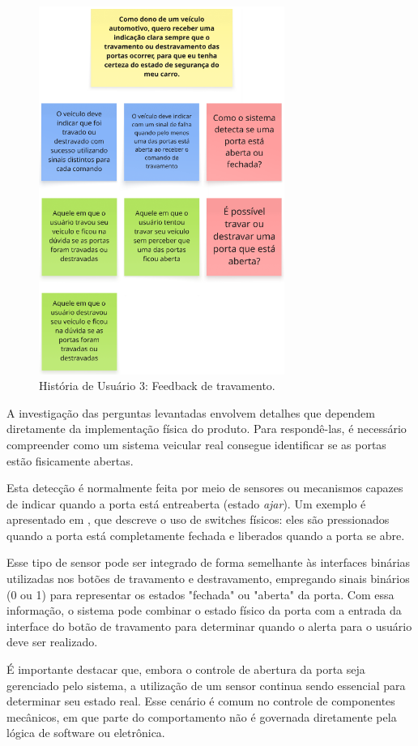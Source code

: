 \begin{figure}[H]
\centering
\includegraphics[height=12cm]{figuras/user_story_3.png}
\caption{História de Usuário 3: Feedback de travamento.}
\label{fig:historia3}
\end{figure}

A investigação das perguntas levantadas envolvem detalhes que dependem diretamente da implementação física do produto. Para respondê-las, é necessário 
compreender como um sistema veicular real consegue identificar se as portas estão fisicamente abertas.

Esta detecção é normalmente feita por meio de sensores ou mecanismos capazes de indicar quando a porta está entreaberta (estado \textit{ajar}). Um exemplo é 
apresentado em , que descreve o uso de switches físicos: eles são pressionados quando a porta está completamente fechada e liberados 
quando a porta se abre. 

Esse tipo de sensor pode ser integrado de forma semelhante às interfaces binárias utilizadas nos botões de travamento e destravamento, empregando sinais 
binários (0 ou 1) para representar os estados "fechada" ou "aberta" da porta. Com essa informação, o sistema pode combinar o estado físico da porta com a 
entrada da interface do botão de travamento para determinar quando o alerta para o usuário deve ser realizado.

É importante destacar que, embora o controle de abertura da porta seja gerenciado pelo sistema, a utilização de um sensor continua sendo essencial para 
determinar seu estado real. Esse cenário é comum no controle de componentes mecânicos, em que parte do comportamento não é governada diretamente pela 
lógica de software ou eletrônica.

